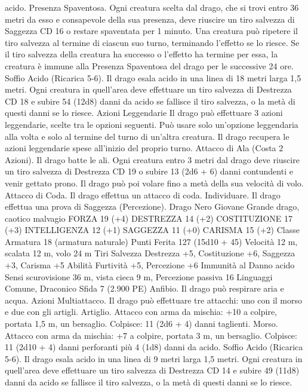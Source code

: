 \begin{multicols}{2}
acido.
Presenza Spaventosa. Ogni creatura scelta dal drago, che si trovi
entro 36 metri da esso e consapevole della sua presenza, deve
riuscire un tiro salvezza di Saggezza CD 16 o restare spaventata
per 1 minuto. Una creatura può ripetere il tiro salvezza al termine
di ciascun suo turno, terminando l’effetto se lo riesce. Se il tiro
salvezza della creatura ha successo o l’effetto ha termine per
essa, la creatura è immune alla Presenza Spaventosa del drago
per le successive 24 ore.
Soffio Acido (Ricarica 5-6). Il drago esala acido in una linea di
18 metri larga 1,5 metri. Ogni creatura in quell’area deve
effettuare un tiro salvezza di Destrezza CD 18 e subire 54 (12d8)
danni da acido se fallisce il tiro salvezza, o la metà di questi
danni se lo riesce.
Azioni Leggendarie
Il drago può effettuare 3 azioni leggendarie, scelte tra le opzioni
seguenti. Può usare solo un’opzione leggendaria alla volta e solo
al termine del turno di un’altra creatura. Il drago recupera le
azioni leggendarie spese all’inizio del proprio turno.
Attacco di Ala (Costa 2 Azioni). Il drago batte le ali. Ogni
creatura entro 3 metri dal drago deve riuscire un tiro salvezza di
Destrezza CD 19 o subire 13 (2d6 + 6) danni contundenti e venir
gettato prono. Il drago può poi volare fino a metà della sua
velocità di volo.
Attacco di Coda. Il drago effettua un attacco di coda.
Individuare. Il drago effettua una prova di Saggezza
(Percezione).
Drago Nero Giovane
Grande drago, caotico malvagio
FORZA 19 (+4)
DESTREZZA 14 (+2)
COSTITUZIONE 17 (+3)
INTELLIGENZA 12 (+1)
SAGGEZZA 11 (+0)
CARISMA 15 (+2)
Classe Armatura 18 (armatura naturale)
Punti Ferita 127 (15d10 + 45)
Velocità 12 m, scalata 12 m, volo 24 m
Tiri Salvezza Destrezza +5, Costituzione +6, Saggezza +3,
Carisma +5
Abilità Furtività +5, Percezione +6
Immunità al Danno acido
Sensi scurovisione 36 m, vista cieca 9 m, Percezione passiva 16
Linguaggi Comune, Draconico
Sfida 7 (2.900 PE)
Anfibio. Il drago può respirare aria e acqua.
Azioni
Multiattacco. Il drago può effettuare tre attacchi: uno con il
morso e due con gli artigli.
Artiglio. Attacco con arma da mischia: +10 a colpire, portata 1,5
m, un bersaglio.
Colpisce: 11 (2d6 + 4) danni taglienti.
Morso. Attacco con arma da mischia: +7 a colpire, portata 3 m,
un bersaglio.
Colpisce: 11 (2d10 + 4) danni perforanti più 4 (1d8) danni da acido.
Soffio Acido (Ricarica 5-6). Il drago esala acido in una linea di 9
metri larga 1,5 metri. Ogni creatura in quell’area deve effettuare un tiro
salvezza di Destrezza CD 14 e subire 49 (11d8) danni da acido se fallisce
il tiro salvezza, o la metà di questi danni se lo riesce.

\end{multicols}
